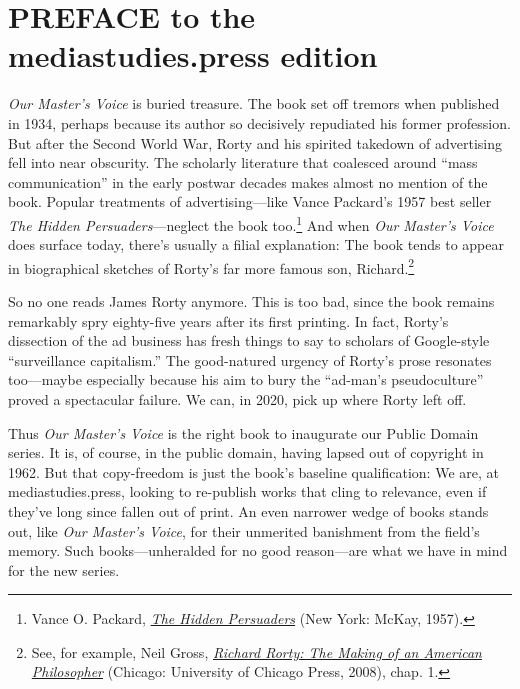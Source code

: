 \documentclass[nohyper,openany,nobib]{tufte-book}
\let\oldchapter\chapter
\def\chapter{%
  \setcounter{footnote}{0}%
  \oldchapter
}
\begin{document}
\chapter{PREFACE to the mediastudies.press edition}
\label{ch:prefacemsp}

  
 \emph{Our Master's Voice} is buried treasure. The book set
off tremors when published in 1934, perhaps because its author so
decisively repudiated his former profession. But after the Second World
War, Rorty and his spirited takedown of advertising fell into near
obscurity. The scholarly literature that coalesced around ``mass
communication'' in the early postwar decades makes almost no mention of
the book. Popular treatments of advertising---like Vance Packard's 1957
best seller \emph{The Hidden Persuaders}---neglect the book too.\footnote{Vance O. Packard, \emph{\href{http://www.worldcat.org/oclc/245181}{The
  Hidden Persuaders}} (New York: McKay, 1957).} And
when \emph{Our Master's Voice} does surface today, there's usually a
filial explanation: The book tends to appear in biographical sketches of
Rorty's far more famous son, Richard.\footnote{See, for example, Neil Gross,
  \emph{\href{http://www.worldcat.org/oclc/474963500}{Richard Rorty: The
  Making of an American Philosopher}} (Chicago: University of Chicago
  Press, 2008), chap. 1.}

So no one reads James Rorty anymore. This is too bad, since the book
remains remarkably spry eighty-five years after its first printing. In
fact, Rorty's dissection of the ad business has fresh things to say to
scholars of Google-style ``surveillance capitalism.'' The good-natured
urgency of Rorty's prose resonates too---maybe especially because his
aim to bury the ``ad-man's pseudoculture'' proved a spectacular failure.
We can, in 2020, pick up where Rorty left off.

Thus \emph{Our Master's Voice} is the right book to inaugurate our
Public Domain series. It is, of course, in the public domain, having
lapsed out of copyright in 1962. But that copy-freedom is just the
book's baseline qualification: We are, at mediastudies.press, looking to
re-publish works that cling to relevance, even if they've long since
fallen out of print. An even narrower wedge of books stands out, like
\emph{Our Master's Voice}, for their unmerited banishment from the
field's memory. Such books---unheralded for no good reason---are what we
have in mind for the new series.
\end{document}
